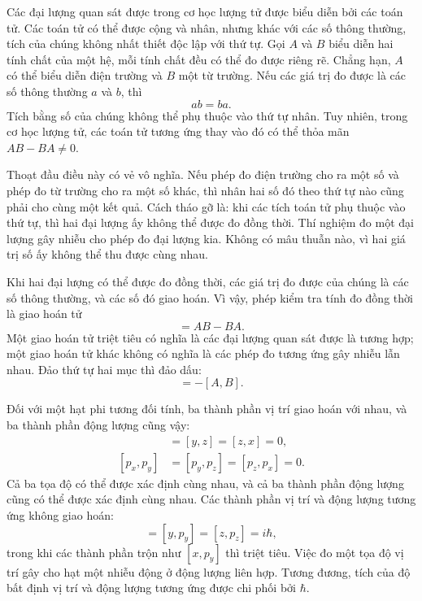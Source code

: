Các đại lượng quan sát được trong cơ học lượng tử được biểu diễn bởi các toán tử. Các toán tử có thể được cộng và nhân, nhưng khác với các số thông thường, tích của chúng không nhất thiết độc lập với thứ tự. Gọi \(A\) và \(B\) biểu diễn hai tính chất của một hệ, mỗi tính chất đều có thể đo được riêng rẽ. Chẳng hạn, \(A\) có thể biểu diễn điện trường và \(B\) một từ trường. Nếu các giá trị đo được là các số thông thường \(a\) và \(b\), thì
\begin{equation}
ab=ba.
\end{equation}
Tích bằng số của chúng không thể phụ thuộc vào thứ tự nhân. Tuy nhiên, trong cơ học lượng tử, các toán tử tương ứng thay vào đó có thể thỏa mãn \(AB-BA\neq0\).

Thoạt đầu điều này có vẻ vô nghĩa. Nếu phép đo điện trường cho ra một số và phép đo từ trường cho ra một số khác, thì nhân hai số đó theo thứ tự nào cũng phải cho cùng một kết quả. Cách tháo gỡ là: khi các tích toán tử phụ thuộc vào thứ tự, thì hai đại lượng ấy không thể được đo đồng thời. Thí nghiệm đo một đại lượng gây nhiễu cho phép đo đại lượng kia. Không có mâu thuẫn nào, vì hai giá trị số ấy không thể thu được cùng nhau.

Khi hai đại lượng có thể được đo đồng thời, các giá trị đo được của chúng là các số thông thường, và các số đó giao hoán. Vì vậy, phép kiểm tra tính đo đồng thời là giao hoán tử
\begin{equation}
[A,B]=AB-BA.
\end{equation}
Một giao hoán tử triệt tiêu có nghĩa là các đại lượng quan sát được là tương hợp; một giao hoán tử khác không có nghĩa là các phép đo tương ứng gây nhiễu lẫn nhau. Đảo thứ tự hai mục thì đảo dấu:
\begin{equation}
[B,A]=-[A,B].
\end{equation}

Đối với một hạt phi tương đối tính, ba thành phần vị trí giao hoán với nhau, và ba thành phần động lượng cũng vậy:
\begin{align}
[x,y]&=[y,z]=[z,x]=0,\\
[p_x,p_y]&=[p_y,p_z]=[p_z,p_x]=0.
\end{align}
Cả ba tọa độ có thể được xác định cùng nhau, và cả ba thành phần động lượng cũng có thể được xác định cùng nhau. Các thành phần vị trí và động lượng tương ứng không giao hoán:
\begin{equation}
[x,p_x]=[y,p_y]=[z,p_z]=i\hbar,
\end{equation}
trong khi các thành phần trộn như \([x,p_y]\) thì triệt tiêu. Việc đo một tọa độ vị trí gây cho hạt một nhiễu động ở động lượng liên hợp. Tương đương, tích của độ bất định vị trí và động lượng tương ứng được chi phối bởi \(\hbar\).

